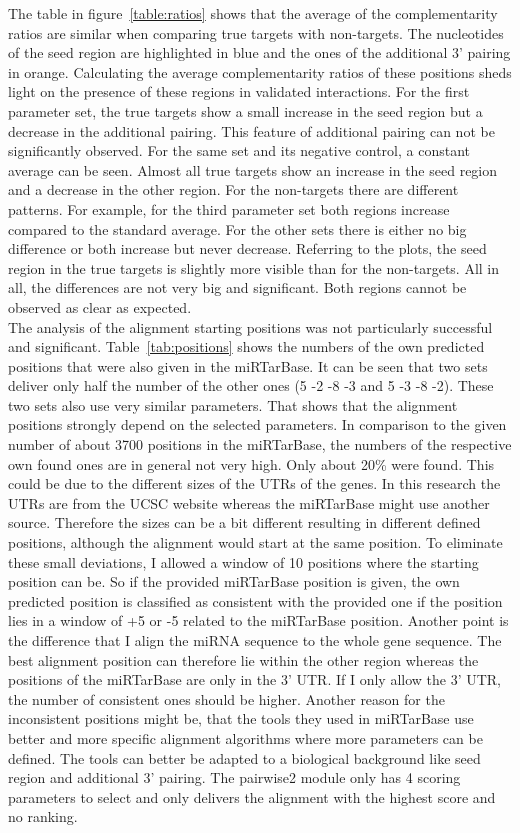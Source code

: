 \documentclass[11pt, a4paper, oneside]{book}
\begin{document}
The table in figure~\ref{table:ratios} shows that the average of the complementarity ratios are similar when comparing true targets with non-targets. The nucleotides of the seed region are highlighted in blue and the ones of the additional 3' pairing in orange. Calculating the average complementarity ratios of these positions sheds light on the presence of these regions in validated interactions. For the first parameter set, the true targets show a small increase in the seed region but a decrease in the additional pairing. This feature of additional pairing can not be significantly observed. For the same set and its negative control, a constant average can be seen. Almost all true targets show an increase in the seed region and a decrease in the other region. For the non-targets there are different patterns. For example, for the third parameter set both regions increase compared to the standard average. For the other sets there is either no big difference or both increase but never decrease. Referring to the plots, the seed region in the true targets is slightly more visible than for the non-targets. All in all, the differences are not very big and significant. Both regions cannot be observed as clear as expected.  \\

The analysis of the alignment starting positions was not particularly successful and significant. Table~\ref{tab:positions} shows the numbers of the own predicted positions that were also given in the miRTarBase. It can be seen that two sets deliver only half the number of the other ones (5 -2 -8 -3 and 5 -3 -8 -2). These two sets also use very similar parameters. That shows that the alignment positions strongly depend on the selected parameters. In comparison to the given number of about 3700 positions in the miRTarBase, the numbers of the respective own found ones are in general not very high. Only about 20\% were found. This could be due to the different sizes of the UTRs of the genes. In this research the UTRs are from the UCSC website whereas the miRTarBase might use another source. Therefore the sizes can be a bit different resulting in different defined positions, although the alignment would start at the same position. To eliminate these small deviations, I allowed a window of 10 positions where the starting position can be. So if the provided miRTarBase position is given, the own predicted position is classified as consistent with the provided one if the position lies in a window of +5 or -5 related to the miRTarBase position. Another point is the difference that I align the miRNA sequence to the whole gene sequence. The best alignment position can therefore lie within the other region whereas the positions of the miRTarBase are only in the 3' UTR. If I only allow the 3' UTR, the number of consistent ones should be higher. Another reason for the inconsistent positions might be, that the tools they used in miRTarBase use better and more specific alignment algorithms where more parameters can be defined. The tools can better be adapted to a biological background like seed region and additional 3' pairing. The pairwise2 module only has 4 scoring parameters to select and only delivers the alignment with the highest score and no ranking.  
\end{document}
